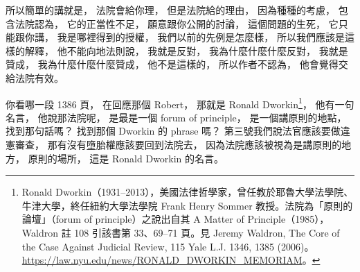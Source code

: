 \hypertarget{w06:cue:2621}{}所以簡單的講就是，
\hypertarget{w06:cue:2622}{}法院會給你理，
\hypertarget{w06:cue:2623}{}但是法院給的理由，
\hypertarget{w06:cue:2624}{}因為種種的考慮，
\hypertarget{w06:cue:2625}{}包含法院認為，
\hypertarget{w06:cue:2626}{}它的正當性不足，
\hypertarget{w06:cue:2627}{}願意跟你公開的討論，
\hypertarget{w06:cue:2628}{}這個問題的生死，
\hypertarget{w06:cue:2629}{}它只能跟你講，
\hypertarget{w06:cue:2630}{}我是哪裡得到的授權，
\hypertarget{w06:cue:2631}{}我們以前的先例是怎麼樣，
\hypertarget{w06:cue:2632}{}所以我們應該是這樣的解釋，
\hypertarget{w06:cue:2633}{}他不能向地法則說，
\hypertarget{w06:cue:2634}{}我就是反對，
\hypertarget{w06:cue:2635}{}我為什麼什麼什麼反對，
\hypertarget{w06:cue:2636}{}我就是贊成，
\hypertarget{w06:cue:2637}{}我為什麼什麼什麼贊成，
\hypertarget{w06:cue:2638}{}他不是這樣的，
\hypertarget{w06:cue:2639}{}所以作者不認為，
\hypertarget{w06:cue:2640}{}他會覺得交給法院有效。

\hypertarget{w06:cue:2641}{}你看哪一段 1386 頁，
\hypertarget{w06:cue:2642}{}在回應那個 Robert，
\hypertarget{w06:cue:2643}{}那就是 Ronald Dworkin\footnote{Ronald Dworkin（1931–2013），美國法律哲學家，曾任教於耶魯大學法學院、牛津大學，終任紐約大學法學院 Frank Henry Sommer 教授。法院為「原則的論壇」（forum of principle）之說出自其 A Matter of Principle（1985），Waldron 註 108 引該書第 33、69–71 頁。見 Jeremy Waldron, The Core of the Case Against Judicial Review, 115 Yale L.J. 1346, 1385 (2006)。\url{https://law.nyu.edu/news/RONALD_DWORKIN_MEMORIAM}。}，
\hypertarget{w06:cue:2644}{}他有一句名言，
\hypertarget{w06:cue:2645}{}他說那法院呢，
\hypertarget{w06:cue:2646}{}是最是一個 forum of principle，
\hypertarget{w06:cue:2647}{}是一個講原則的地點，
\hypertarget{w06:cue:2648}{}找到那句話嗎？
\hypertarget{w06:cue:2649}{}找到那個 Dworkin 的 phrase 嗎？
\hypertarget{w06:cue:2650}{}第三號我們說法官應該要做違憲審查，
\hypertarget{w06:cue:2651}{}那有沒有墮胎權應該要回到法院去，
\hypertarget{w06:cue:2652}{}因為法院應該被視為是講原則的地方，
\hypertarget{w06:cue:2653}{}原則的場所，
\hypertarget{w06:cue:2654}{}這是 Ronald Dworkin 的名言。

